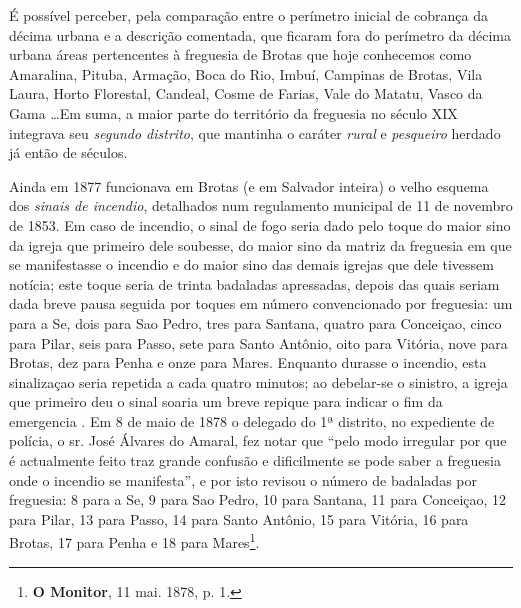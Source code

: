 \begin{enumerate}
\end{enumerate}

É possível perceber, pela comparação entre o perímetro inicial de cobrança da décima urbana e a descrição comentada, que ficaram fora do perímetro da décima urbana áreas pertencentes à freguesia de Brotas que hoje conhecemos como Amaralina, Pituba, Armação, Boca do Rio, Imbuí, Campinas de Brotas, Vila Laura, Horto Florestal, Candeal, Cosme de Farias, Vale do Matatu, Vasco da Gama \dots Em suma, a maior parte do território da freguesia no século XIX integrava seu \textit{segundo distrito}, que mantinha o caráter \textit{rural} e \textit{pesqueiro} herdado já então de séculos.

Ainda em 1877 funcionava em Brotas (e em Salvador inteira) o velho esquema dos \textit{sinais de incendio}, detalhados num regulamento municipal de 11 de novembro de 1853. Em caso de incendio, o sinal de fogo seria dado pelo toque do maior sino da igreja que primeiro dele soubesse, do maior sino da matriz da freguesia em que se manifestasse o incendio e do maior sino das demais igrejas que dele tivessem notícia; este toque seria de trinta badaladas apressadas, depois das quais seriam dada breve pausa seguida por toques em número convencionado por freguesia: um para a Se, dois para Sao Pedro, tres para Santana, quatro para Conceiçao, cinco para Pilar, seis para Passo, sete para Santo Antônio, oito para Vitória, nove para Brotas, dez para Penha e onze para Mares. Enquanto durasse o incendio, esta sinalizaçao seria repetida a cada quatro minutos; ao debelar-se o sinistro, a igreja que primeiro deu o sinal soaria um breve repique para indicar o fim da emergencia \cite[pp.~192-193]{macosta_almana_1877}. Em 8 de maio de 1878 o delegado do 1ª distrito, no expediente de polícia, o sr. José Álvares do Amaral, fez notar que ``pelo modo irregular por que é actualmente feito traz grande confusão e dificilmente se pode saber a freguesia onde o incendio se manifesta'', e por isto revisou o número de badaladas por freguesia: 8 para a Se, 9 para Sao Pedro, 10 para Santana, 11 para Conceiçao, 12 para Pilar, 13 para Passo, 14 para Santo Antônio, 15 para Vitória, 16 para Brotas, 17 para Penha e 18 para Mares\footnote{\textbf{O Monitor}, 11 mai. 1878, p. 1.}.

